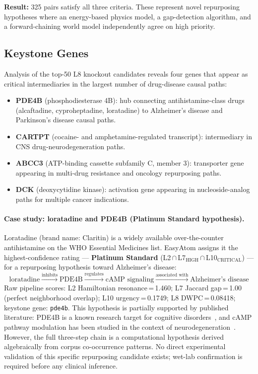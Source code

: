 \documentclass[11pt]{article}
\begin{document}
\textbf{Result:} 325 pairs satisfy all three criteria.
These represent novel repurposing hypotheses where an energy-based
physics model, a gap-detection algorithm, and a forward-chaining
world model independently agree on high priority.

\subsection{Keystone Genes}
\label{sec:keystone}

Analysis of the top-50 L8 knockout candidates reveals four genes that
appear as critical intermediaries in the largest number of
drug-disease causal paths:

\begin{itemize}[noitemsep]
  \item \textbf{PDE4B} (phosphodiesterase 4B): hub connecting
    antihistamine-class drugs (alcaftadine, cyproheptadine, loratadine)
    to Alzheimer's disease and Parkinson's disease causal paths.
  \item \textbf{CARTPT} (cocaine- and amphetamine-regulated transcript):
    intermediary in CNS drug-neurodegeneration paths.
  \item \textbf{ABCC3} (ATP-binding cassette subfamily C, member 3):
    transporter gene appearing in multi-drug resistance and
    oncology repurposing paths.
  \item \textbf{DCK} (deoxycytidine kinase): activation gene appearing
    in nucleoside-analog paths for multiple cancer indications.
\end{itemize}

\paragraph{Case study: loratadine and PDE4B (Platinum Standard hypothesis).}
Loratadine (brand name: Claritin) is a widely available over-the-counter
antihistamine on the WHO Essential Medicines list.
EasyAtom assigns it the highest-confidence rating — \textbf{Platinum Standard}
(L2\,$\cap$\,L7$_\mathrm{HIGH}$\,$\cap$\,L10$_\mathrm{CRITICAL}$) —
for a repurposing hypothesis toward Alzheimer's disease:
\[
  \text{loratadine} \xrightarrow{\text{inhibits}} \text{PDE4B}
  \xrightarrow{\text{regulates}} \text{cAMP signaling}
  \xrightarrow{\text{associated with}} \text{Alzheimer's disease}
\]
Raw pipeline scores: L2 Hamiltonian resonance\,=\,1.460;
L7 Jaccard gap\,=\,1.00 (perfect neighborhood overlap);
L10 urgency\,=\,0.1749; L8 DWPC\,=\,0.08418; keystone gene: \texttt{pde4b}.
This hypothesis is partially supported by published literature:
PDE4B is a known research target for cognitive disorders~\cite{bolger1997pde4},
and cAMP pathway modulation has been studied in the context of
neurodegeneration~\cite{vitolo2002camp}.
However, the full three-step chain is a computational hypothesis derived
algebraically from corpus co-occurrence patterns.
No direct experimental validation of this specific repurposing candidate
exists; wet-lab confirmation is required before any clinical inference.
\end{document}
